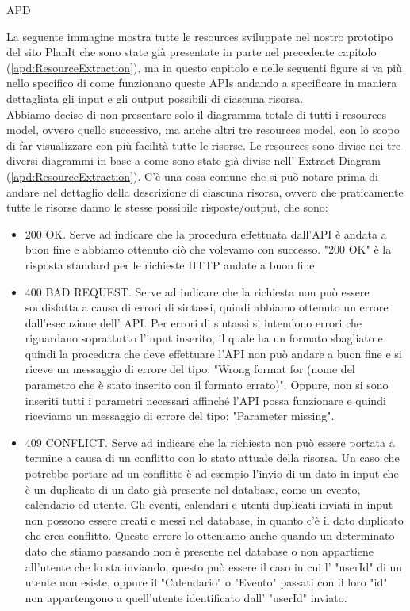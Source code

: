 \begin{listaPersonale} {APD}
\begin{listaPersonale2}[APD]{}
        La seguente immagine mostra tutte le resources sviluppate nel nostro prototipo del sito PlanIt che sono state già presentate in parte nel precedente capitolo (\ref{apd:ResourceExtraction}), ma in questo capitolo e nelle seguenti figure si va più nello specifico di come funzionano queste APIs andando a specificare in maniera dettagliata gli input e gli output possibili di ciascuna risorsa. \\
        Abbiamo deciso di non presentare solo il diagramma totale di tutti i resources model, ovvero quello successivo, ma anche altri tre resources model, con lo scopo di far visualizzare con più facilità tutte le risorse. Le resources sono divise nei tre diversi diagrammi in base a come sono state già divise nell' Extract Diagram (\ref{apd:ResourceExtraction}).
        C'è una cosa comune che si può notare prima di andare nel dettaglio della descrizione di ciascuna risorsa, ovvero che praticamente tutte le risorse danno le stesse possibile risposte/output, che sono:
        \begin{itemize}
            \item 200 OK. Serve ad indicare che la procedura effettuata dall'API è andata a buon fine e abbiamo ottenuto ciò che volevamo con successo. "200 OK" è la risposta standard per le richieste HTTP andate a buon fine.
            \item 400 BAD REQUEST. Serve ad indicare che la richiesta non può essere soddisfatta a causa di errori di sintassi, quindi abbiamo ottenuto un errore dall'esecuzione dell' API. Per errori di sintassi si intendono errori che riguardano soprattutto l'input inserito, il quale ha un formato sbagliato e quindi la procedura che deve effettuare l'API non può andare a buon fine e si riceve un messaggio di errore del tipo: "Wrong format for (nome del parametro che è stato inserito con il formato errato)". Oppure, non si sono inseriti tutti i parametri necessari affinché l'API possa funzionare e quindi riceviamo un messaggio di errore del tipo: "Parameter missing".
            \item 409 CONFLICT. Serve ad indicare che la richiesta non può essere portata a termine a causa di un conflitto con lo stato attuale della risorsa. Un caso che potrebbe portare ad un conflitto è ad esempio l'invio di un dato in input che è un duplicato di un dato già presente nel database, come un evento, calendario ed utente. Gli eventi, calendari e utenti duplicati inviati in input non possono essere creati e messi nel database, in quanto c'è il dato duplicato che crea conflitto. Questo errore lo otteniamo anche quando un determinato dato che stiamo passando non è presente nel database o non appartiene all'utente che lo sta inviando, questo può essere il caso in cui l' "userId" di un utente non esiste, oppure il "Calendario" o "Evento" passati con il loro "id" non appartengono a quell'utente identificato dall' "userId" inviato.

\end{itemize}
\end{listaPersonale2}
\end{listaPersonale}
